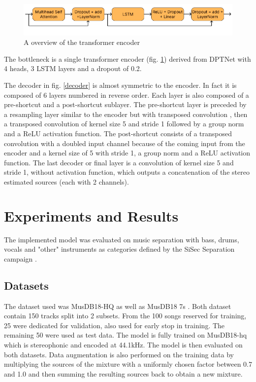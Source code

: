 \documentclass[final]{cvpr}
\begin{document}
\begin{figure}
   \includegraphics[scale=0.4]{transformer.png}
   \caption{A overview of the transformer encoder}
   \label{transformer}
\end{figure}
The bottleneck is a single transformer encoder (fig. \ref{transformer}) derived from DPTNet\cite{dptnet} with 4 heads, 3 LSTM layers and a dropout of 0.2.


The decoder in fig. \ref{decoder} is almost symmetric to the encoder. In fact it is composed of 6 layers numbered in reverse order. Each layer is also composed of a pre-shortcut and a post-shortcut sublayer. The pre-shortcut layer is preceded by a resampling layer similar to the encoder but with transposed convolution \cite{waveunet}, then a transposed convolution of kernel size 5 and stride 1 followed by a group norm and a ReLU activation function. The post-shortcut consists of a transposed convolution with a doubled input channel because of the coming input from the encoder and a kernel size of 5 with stride 1, a group norm and a ReLU activation function.
The last decoder or final layer is a convolution of kernel size 5 and stride 1, without activation function, which outputs a concatenation of the stereo estimated sources (each with 2 channels).

\section{Experiments and Results}
 The implemented model was evaluated on music separation with bass, drums, vocals and "other" instruments as categories defined by the SiSec Separation campaign \cite{SiSec}.
\subsection{Datasets}
The dataset used was MusDB18-HQ \cite{MUSDB18HQ} as well as MusDB18 7s \cite{musdb18}. Both dataset contain 150 tracks split into 2 subsets. From the 100 songs reserved for training, 25 were dedicated for validation, also used for early stop in training. The remaining 50 were used as test data. The model is fully trained on MusDB18-hq which is stereophonic and encoded at 44.1kHz. The model is then evaluated on both datasets.
Data augmentation is also performed on the training data by multiplying the sources of the mixture with a uniformly chosen factor between 0.7 and 1.0 and then summing the resulting sources back to obtain a new mixture.\cite{waveunet}  
\end{document}
